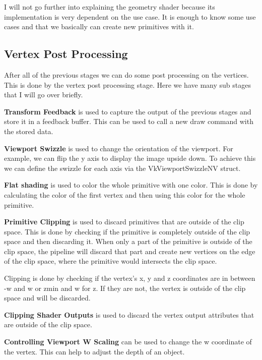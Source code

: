 \documentclass[12pt]{report} \usepackage{preamble}
\begin{document}
I will not go further into explaining the geometry shader because its implementation is very dependent on the use case. It is enough to know
some use cases and that we basically can create new primitives with it.

\subsection{Vertex Post Processing}

After all of the previous stages we can do some post processing on the vertices. This is done by the vertex post processing stage.
Here we have many sub stages that I will go over briefly.

\textbf{Transform Feedback} is used to capture the output of the previous stages and store it in a feedback buffer. This can be used to
call a new draw command with the stored data. \cite{vertex-post-processing}

\textbf{Viewport Swizzle} is used to change the orientation of the viewport. For example, we can flip the y axis to display the image upside down.
To achieve this we can define the swizzle for each axis via the VkViewportSwizzleNV struct. \cite{vertex-post-processing}

\textbf{Flat shading} is used to color the whole primitive with one color. This is done by calculating the color of the first vertex and then
using this color for the whole primitive. \cite{vertex-post-processing}

\textbf{Primitive Clipping} is used to discard primitives that are outside of the clip space. This is done by checking if the primitive is
completely outside of the clip space and then discarding it. \cite{vertex-post-processing}
When only a part of the primitive is outside of the clip space, the pipeline will discard that part and create new vertices on the edge of the clip space,
where the primitive would intersects the clip space. \cite{vertex-post-processing}

Clipping is done by checking if the vertex's x, y and z coordinates are in between -w and w or z\textunderscore min and w for z.
If they are not, the vertex is outside of the clip space and will be discarded.

\textbf{Clipping Shader Outputs} is used to discard the vertex output attributes that are outside of the clip space.

\textbf{Controlling Viewport W Scaling} can be used to change the w coordinate of the vertex. This can help to adjust the depth of an object.
\end{document}
